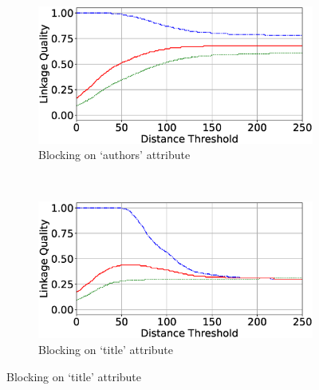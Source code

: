 \documentclass{llncs}
\begin{document}
\begin{figure}
\begin{subfigure}{.47\textwidth}
  \centering
\includegraphics[width=\textwidth]{figures/plotLQ-cora-trad-authors}
\vspace{-6mm}
\caption{Blocking on `authors' attribute}
\end{subfigure}%
~~
\begin{subfigure}{.47\textwidth}
  \centering
\includegraphics[width=\textwidth]{figures/plotLQ-cora-trad-title}
\vspace{-6mm}
\caption{Blocking on `title' attribute}
\end{subfigure} \vspace{3mm}


\end{figure}
\end{document}
